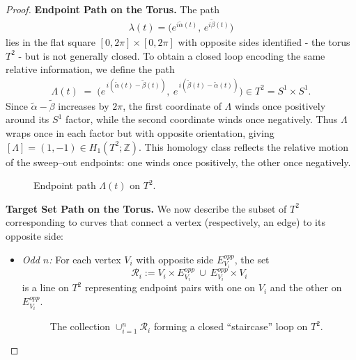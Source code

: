 \begin{proof}
\noindent \textbf{Endpoint Path on the Torus.} The path 
\begin{align*}
\lambda(t) = \big(e^{i\tilde\alpha(t)},\, e^{i\tilde\beta(t)}\big)
\end{align*}
lies in the flat square $[0,2\pi]\times[0,2\pi]$ with opposite sides identified - the torus $T^2$ - but is not generally closed. To obtain a closed loop encoding the same relative information, we define the path
\begin{align*}
\Lambda(t)\;=\;\big(e^{\,i(\tilde\alpha(t)-\tilde\beta(t))},\ e^{\,i(\tilde\beta(t)-\tilde\alpha(t))}\big)\in T^2 = S^1\times S^1.
\end{align*}
\noindent Since $\tilde\alpha-\tilde\beta$ increases by $2\pi$, the first coordinate of $\Lambda$ winds once positively around its $S^1$ factor, while the second coordinate winds once negatively. Thus $\Lambda$ wraps once in each factor but with opposite orientation, giving $[\Lambda]=(1,-1) \in H_1(T^2;\mathbb{Z})$. This homology class reflects the relative motion of the sweep–out endpoints: one winds once positively, the other once negatively.
\begin{figure}[ht]
    \centering
    
    \caption{Endpoint path $\Lambda(t)$ on $T^2$.}
\end{figure}
\FloatBarrier

\noindent \textbf{Target Set Path on the Torus.} 
We now describe the subset of $T^2$ corresponding to curves that connect a vertex (respectively, an edge) to its opposite side:
\begin{itemize}
\item \emph{Odd $n$:} For each vertex $V_i$ with opposite side $E_{V_i}^{opp}$, the set
\[
\mathcal{R}_i := V_i\times E_{V_i}^{opp} \ \cup\ E_{V_i}^{opp}\times V_i
\]
is a line on $T^2$ representing endpoint pairs with one on $V_i$ and the other on $E_{V_i}^{opp}$.

\begin{figure}[ht]
    \centering
    
    \caption{The collection $\cup_{i=1}^n \mathcal R_i$ forming a closed “staircase” loop on $T^2$.}
\end{figure}
\FloatBarrier


\end{itemize}
\end{proof}
